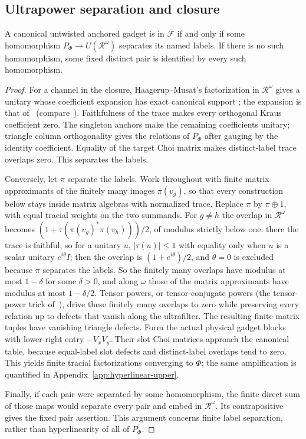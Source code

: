 \subsection{Ultrapower separation and closure}

\begin{lemma}\label{lem:ultrapower-labels}
A canonical untwisted anchored gadget is in $\overline{\mathcal F}$
if and only if some homomorphism
$P_\Phi\to U(\mathcal R^\omega)$ separates its named labels.
If there is no such homomorphism, some fixed distinct pair is
identified by every such homomorphism.
\end{lemma}
\begin{proof}
For a channel in the closure, Haagerup--Musat's factorization
in $\mathcal R^\omega$ gives a unitary whose coefficient expansion
has exact canonical support
\cite[Theorem~3.6]{HaagerupMusat2015}; the expansion is that
of~\cite[Theorem~2.2]{HaagerupMusat2011} (compare~\cite[Proposition~3.9]{Musat2025}).
Faithfulness of the trace makes every orthogonal Kraus coefficient
zero. The singleton anchors make the remaining coefficients
unitary; triangle column orthogonality gives the relations of
$P_\Phi$ after gauging by the identity coefficient. Equality of
the target Choi matrix makes distinct-label trace overlaps zero.
This separates the labels.

Conversely, let $\pi$ separate the labels. Work throughout with
finite matrix approximants of the finitely many images $\pi(v_g)$,
so that every construction below stays inside matrix algebras with
normalized trace. Replace $\pi$ by $\pi\oplus1$, with equal tracial
weights on the two summands. For $g\ne h$ the overlap in
$\mathcal R^\omega$ becomes $(1+\tau(\pi(v_g)^*\pi(v_h)))/2$, of modulus
strictly below one: there the trace is faithful, so for a unitary $u$,
$|\tau(u)|\le1$ with equality only when $u$ is a scalar unitary
$e^{i\theta}I$; then the overlap is $(1+e^{i\theta})/2$, and $\theta=0$
is excluded because $\pi$ separates the labels. So the finitely many
overlaps have modulus at most $1-\delta$ for some $\delta>0$, and along
$\omega$ those of the matrix approximants have modulus at most
$1-\delta/2$.
Tensor powers, or tensor-conjugate powers (the tensor-power trick
of~\cite[Lemma~2.2]{SlofstraVidick2018}), drive these finitely
many overlaps to zero while preserving every relation up to defects
that vanish along the ultrafilter. The resulting finite matrix
tuples have vanishing triangle defects. Form the actual physical gadget
blocks with lower-right entry $-V_xV_y$. Their slot Choi matrices
approach the canonical table, because equal-label slot defects
and distinct-label overlaps tend to zero. This yields finite tracial
factorizations converging to $\Phi$; the same amplification is quantified
in Appendix~\ref{app:hyperlinear-upper}.

Finally, if each pair were separated by some homomorphism, the
finite direct sum of those maps would separate every pair and
embed in $\mathcal R^\omega$. Its contrapositive gives the fixed
pair assertion. This argument concerns finite label separation,
rather than hyperlinearity of all of $P_\Phi$.
\end{proof}

